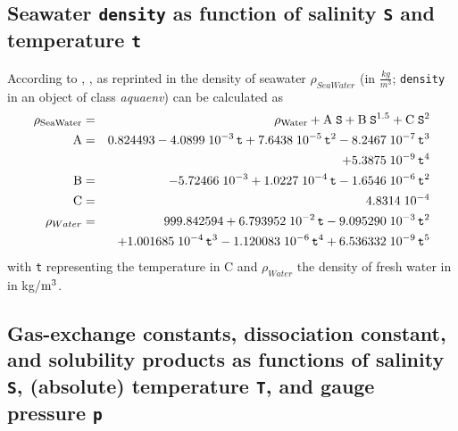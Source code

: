 \documentclass[a4paper]{article}
\begin{document}
\subsection{Seawater \texttt{density} as function of salinity \texttt{S} and temperature \texttt{t}}
According to \citep{Millero1981}, \citet[p. 434]{Millero1982}, as reprinted in \citet[chap. 5, p. 6f]{DOE1994} the density of seawater $\rho_{SeaWater}$ (in $\frac{kg}{m^3}$; \texttt{density} in an object of class \textit{aquaenv}) can be calculated as
\begin{eqnarray}
\rm \rho_{SeaWater} &=&\rm \rho_{Water} + A\;\mbox{\texttt{S}} + B\;\mbox{\texttt{S}}^{1.5} + C\; \mbox{\texttt{S}}^2\\
\rm A &=& \rm 0.824493 - 4.0899 \; 10^{-3} \, \mbox{\texttt{t}} + 7.6438 \; 10^{-5} \, \mbox{\texttt{t}}^2 - 8.2467 \; 10^{-7}  \,\mbox{\texttt{t}}^3\\
  && \rm + 5.3875 \; 10^{-9} \, \mbox{\texttt{t}}^4\\
\rm B &=& \rm -5.72466 \; 10^{-3} + 1.0227 \; 10^{-4} \, \mbox{\texttt{t}} - 1.6546\; 10^{-6} \, \mbox{\texttt{t}}^2 \\
\rm C &=& 4.8314\;10^{-4} \\
\rho_{Water} &=& 999.842594 + 6.793952\;10^{-2} \, \mbox{\texttt{t}} - 9.095290\;10^{-3} \, \mbox{\texttt{t}}^2\\
                                    && + 1.001685\;10^{-4}\,\mbox{\texttt{t}}^3 - 1.120083\;10^{-6} \, \mbox{\texttt{t}}^4 + 6.536332\;10^{-9} \, \mbox{\texttt{t}}^5
\end{eqnarray}
\noindent
with \texttt{t} representing the temperature in \textdegree$ $C and $\rho_{Water}$ the density of fresh water in in kg/$\rm m^3$.

\subsection{Gas-exchange constants, dissociation constant, and solubility products as functions of salinity \texttt{S}, (absolute) temperature \texttt{T}, and gauge pressure \texttt{p}}
\end{document}
